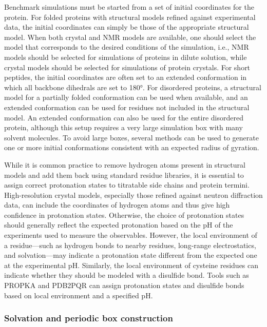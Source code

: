 \documentclass[9pt,review,pubversion]{livecoms}
\begin{document}
Benchmark simulations must be started from a set of initial coordinates for the protein.
For folded proteins with structural models refined against experimental data, the initial coordinates can simply be those of the appropriate structural model.
When both crystal and NMR models are available, one should select the model that corresponds to the desired conditions of the simulation, i.e., NMR models should be selected for simulations of proteins in dilute solution, while crystal models should be selected for simulations of protein crystals.
For short peptides, the initial coordinates are often set to an extended conformation in which all backbone dihedrals are set to \ang{180}.
For disordered proteins, a structural model for a partially folded conformation can be used when available, and an extended conformation can be used for residues not included in the structural model.
An extended conformation can also be used for the entire disordered protein, although this setup requires a very large simulation box with many solvent molecules.
To avoid large boxes, several methods \cite{feldman_fast_2000,feldman_probabilistic_2002,ozenne_flexible-meccano_2012,estana_realistic_2019,ferrie_unified_2020,teixeira_idpconformergenerator_2022} can be used to generate one or more initial conformations consistent with an expected radius of gyration.

While it is common practice to remove hydrogen atoms present in structural models and add them back using standard residue libraries, it is essential to assign correct protonation states to titratable side chains and protein termini.
High-resolution crystal models, especially those refined against neutron diffraction data, can include the coordinates of hydrogen atoms and thus give high confidence in protonation states.
Otherwise, the choice of protonation states should generally reflect the expected protonation based on the pH of the experiments used to measure the observables.
However, the local environment of a residue---such as hydrogen bonds to nearby residues, long-range electrostatics, and solvation---may indicate a protonation state different from the expected one at the experimental pH.
Similarly, the local environment of cysteine residues can indicate whether they should be modeled with a disulfide bond.
Tools such as PROPKA \cite{olsson_propka3_2011} and PDB2PQR \cite{jurrus_improvements_2018} can assign protonation states and disulfide bonds based on local environment and a specified pH.

\subsubsection{Solvation and periodic box construction}
\label{sub2:solvation}
\end{document}
